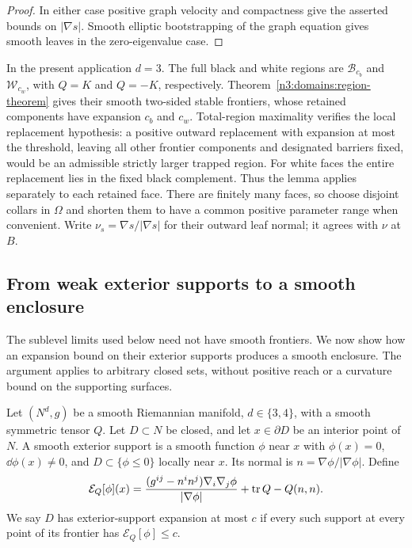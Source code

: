 \begin{proof}
In either case positive graph velocity and compactness give the
asserted bounds on $|\nabla s|$.  Smooth elliptic bootstrapping of
the graph equation gives smooth leaves in the zero-eigenvalue case.
\end{proof}

In the present application $d=3$.  The full black and white regions
are $\mathcal B_{c_b}$ and $\mathcal W_{c_w}$, with $Q=K$ and
$Q=-K$, respectively.  Theorem~\ref{n3:domains:region-theorem}
gives their smooth two-sided stable frontiers, whose retained
components have expansion $c_b$ and $c_w$.  Total-region maximality
verifies the local replacement hypothesis: a positive outward
replacement with expansion at most the threshold, leaving all
other frontier components and designated barriers fixed, would
be an admissible strictly larger trapped region.  For white faces
the entire replacement lies in the fixed black complement.
Thus the lemma applies separately to each retained face.
There are finitely many faces, so choose disjoint
collars in $\Omega$ and shorten them to have a common positive
parameter range when convenient.  Write $\nu_s=\nabla s/|\nabla s|$
for their outward leaf normal; it agrees with $\nu$ at $B$.

\subsection{From weak exterior supports to a smooth enclosure}

The sublevel limits used below need not have smooth frontiers.  We now
show how an expansion bound on their exterior supports produces a smooth
enclosure.  The argument applies to arbitrary closed sets, without
positive reach or a curvature bound on the supporting surfaces.

\begin{definition}\label{n3:domains:support-definition}
Let $(N^d,g)$ be a smooth Riemannian manifold, $d\in\{3,4\}$,
with a smooth symmetric tensor $Q$.  Let $D\subset N$ be closed,
and let $x\in\partial D$ be an interior point of $N$.
A smooth exterior support is a smooth function $\phi$ near $x$ with
$\phi(x)=0$, $\dd\phi(x)\ne0$, and
$D\subset\{\phi\leq0\}$ locally near $x$.  Its normal is
$n=\nabla\phi/|\nabla\phi|$.  Define
\begin{equation}\label{n3:domains:test-expansion}
 \mathcal E_Q[\phi](x)
   =\frac{(g^{ij}-n^in^j)\nabla_i\nabla_j\phi}{|\nabla\phi|}
       +\operatorname{tr} Q-Q(n,n).
\end{equation}
We say $D$ has exterior-support expansion at most $c$ if every such
support at every point of its frontier has
$\mathcal E_Q[\phi]\leq c$.
\end{definition}

